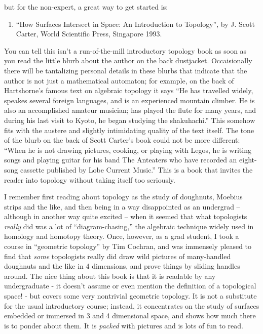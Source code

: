 \documentclass{article}
\def\tightlist{}
\begin{document}
but for the non-expert, a great way to get started is:

\begin{enumerate}
\def\labelenumi{\arabic{enumi})}
\setcounter{enumi}{1}
\tightlist
\item
  ``How Surfaces Intersect in Space: An Introduction to Topology'', by
  J. Scott Carter, World Scientific Press, Singapore 1993.
\end{enumerate}

You can tell this isn't a run-of-the-mill introductory topology book as
soon as you read the little blurb about the author on the back
dustjacket. Occaisionally there will be tantalizing personal details in
these blurbs that indicate that the author is not just a mathematical
automaton; for example, on the back of Hartshorne's famous text on
algebraic topology it says ``He has travelled widely, speakes several
foreign languages, and is an experienced mountain climber. He is also an
accomplished amateur musician; has played the flute for many years, and
during his last visit to Kyoto, he began studying the shakuhachi.'' This
somehow fits with the austere and slightly intimidating quality of the
text itself. The tone of the blurb on the back of Scott Carter's book
could not be more different: ``When he is not drawing pictures, cooking,
or playing with Legos, he is writing songs and playing guitar for his
band The Anteaters who have recorded an eight-song cassette published by
Lobe Current Music.'' This is a book that invites the reader into
topology without taking itself too seriously.

I remember first reading about topology as the study of doughnuts,
Moebius strips and the like, and then being in a way disappointed as an
undergrad -- although in another way quite excited -- when it seemed
that what topologists \emph{really} did was a lot of
``diagram-chasing,'' the algebraic technique widely used in homology and
homotopy theory. Once, however, as a grad student, I took a course in
``geometric topology'' by Tim Cochran, and was immensely pleased to find
that \emph{some} topologists really did draw wild pictures of
many-handled doughnuts and the like in 4 dimensions, and prove things by
sliding handles around. The nice thing about this book is that it is
readable by any undergraduate - it doesn't assume or even mention the
definition of a topological space! - but covers some very nontrivial
geometric topology. It is not a substitute for the usual introductory
course; instead, it concentrates on the study of surfaces embedded or
immersed in 3 and 4 dimensional space, and shows how much there is to
ponder about them. It is \emph{packed} with pictures and is lots of fun
to read.
\end{document}
